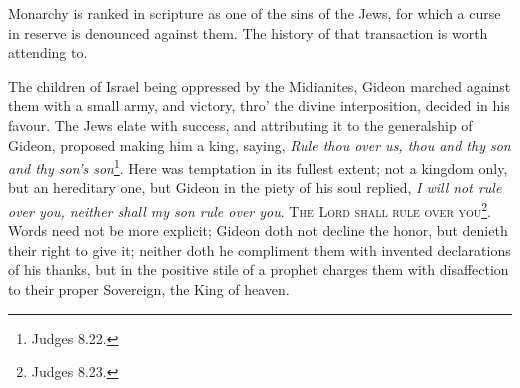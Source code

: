 \documentclass[12pt, twocolumn]{book}
\begin{document}
    Monarchy is ranked in scripture as one of the sins of the Jews, for which a curse in reserve is denounced against them. The history of that transaction is worth attending to.

    The children of Israel being oppressed by the Midianites, Gideon marched against them with a small army, and victory, thro’ the divine interposition, decided in his favour. The Jews elate with success, and attributing it to the generalship of Gideon, proposed making him a king, saying, \textit{Rule thou over us, thou and thy son and thy son’s son}\footnote{Judges 8.22.}. Here was temptation in its fullest extent; not a kingdom only, but an hereditary one, but Gideon in the piety of his soul replied, \textit{I will not rule over you, neither shall my son rule over you}. \textsc{The Lord shall rule over you}\footnote{Judges 8.23.}. Words need not be more explicit; Gideon doth not decline the honor, but denieth their right to give it; neither doth he compliment them with invented declarations of his thanks, but in the positive stile of a prophet charges them with disaffection to their proper Sovereign, the King of heaven.
\end{document}

